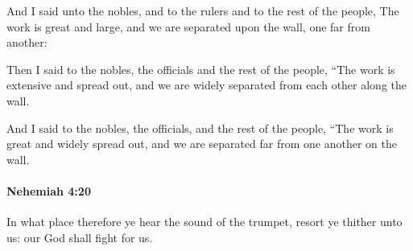 			\begin{versebox}
					\item[BHS] 
					\item[LXX] 
					\item[ASV] And I said unto the nobles, and to the rulers and to the rest of the people, The work is great and large, and we are separated upon the wall, one far from another:
					\item[NIV] Then I said to the nobles, the officials and the rest of the people, “The work is extensive and spread out, and we are widely separated from each other along the wall.
					\item[NRSV] And I said to the nobles, the officials, and the rest of the people, “The work is great and widely spread out, and we are separated far from one another on the wall.
			\end{versebox}

		\paragraph{Nehemiah 4:20} %
			\label{NEHEMIAH-4-20}

			In what place therefore ye hear the sound of the trumpet, resort ye thither unto us: our God shall fight for us.

